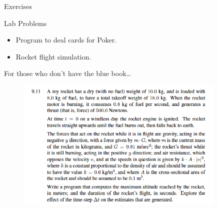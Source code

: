 \documentclass{beamer}
\begin{document}
\begin{frame}{Exercises}
    \begin{block}{Lab Problems}
        \begin{itemize}
            \item[9.3] Program to deal cards for Poker.
            \item[9.11] Rocket flight simulation.
        \end{itemize}
    \end{block}
\end{frame}

\begin{frame}{9.11}
    For those who don't have the blue book\ldots
    \begin{figure}
        \includegraphics[width=10cm]{e09-11.png}
    \end{figure}
\end{frame}

%
%
%
%
%
%
%
%
%
%
%
%
%
%
%
%
%
%
%
%
%
\end{document}
